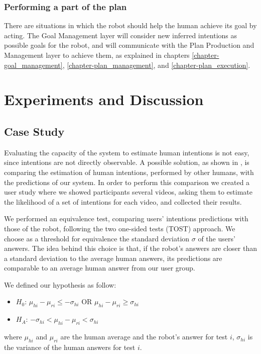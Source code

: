 \subsubsection{Performing a part of the plan}
There are situations in which the robot should help the human achieve its goal by acting. The Goal Management layer will consider new inferred intentions as possible goals for the robot, and will communicate with the Plan Production and Management layer to achieve them, as explained in chapters \ref{chapter-goal_management}, \ref{chapter-plan_management}, and \ref{chapter-plan_execution}. 


\section{Experiments and Discussion}
\label{sec:situation_assessment-experiments}
\subsection{Case Study}
Evaluating the capacity of the system to estimate human intentions is not easy, since intentions are not directly observable. A possible solution, as shown in \cite{baker2014modeling}, is comparing the estimation of human intentions, performed by other humans, with the predictions of our system. In order to perform this comparison we created a user study where we showed participants several videos, asking them to estimate the likelihood of a set of intentions for each video, and collected their results. 

We performed an equivalence test, comparing users' intentions predictions with those of the robot, following the two one-sided tests (TOST) approach. We choose as a threshold for equivalence the standard deviation $\sigma$ of the users' answers. The idea behind this choice is that, if the robot's answers are closer than a standard deviation to the average human answers, its predictions are comparable to an average human answer from our user group. 

We defined our hypothesis as follow: 
\begin{itemize}
\item $H_0$: $\mu_{hi}-\mu_{ri}\leq-\sigma_{hi}$ OR $\mu_{hi}-\mu_{ri}\geq\sigma_{hi}$ 
\item $H_A$: $-\sigma_{hi}<\mu_{hi}-\mu_{ri}<\sigma_{hi}$  
\end{itemize}
where $\mu_{hi}$ and $\mu_{ri}$ are the human average and the robot's answer for test $i$, $\sigma_{hi}$ is the variance of the human answers for test $i$.

